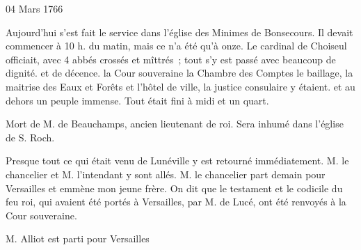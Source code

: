                      \begin{diary}{04 Mars 1766}{}
                        
                         Aujourd'hui s'est fait le service dans
                           l’église des Minimes de
                              Bonsecours. Il
                           devait commencer à 10 h. du matin, mais
                           ce n'a été qu'à onze. Le cardinal de Choiseul
                           officiait, avec 4 abbés crossés et mîttrés ;
                           tout s'y est passé avec beaucoup de dignité.
                           et de décence. la Cour souveraine
                           la Chambre des Comptes
                           le
                              baillage, la maitrise
                              des Eaux et Forêts et l'hôtel
                              de ville, la justice consulaire y étaient.
                           et au dehors un peuple immense. Tout
                           était fini à midi et un quart. \bigskip
        
        
                         Mort de M.
                              de Beauchamps, ancien lieutenant
                           de roi. Sera inhumé dans l’église de
                              S. Roch. \bigskip
        
        
                        
                         Presque tout ce qui était venu de
                           Lunéville y est retourné immédiatement.
                           M. le chancelier et M. l'intendant y
                           sont allés. M. le chancelier
                           part demain
                           pour Versailles et emmène
                           mon jeune frère.
                           On dit que le testament et le codicile du
                           feu roi, qui avaient été
                           portés à
                           Versailles, par M. de Lucé, ont été renvoyés
                           à la Cour souveraine. \bigskip
        
        
                        
                           M. Alliot est parti pour Versailles
                        \bigskip
        
        
                     \end{diary}
